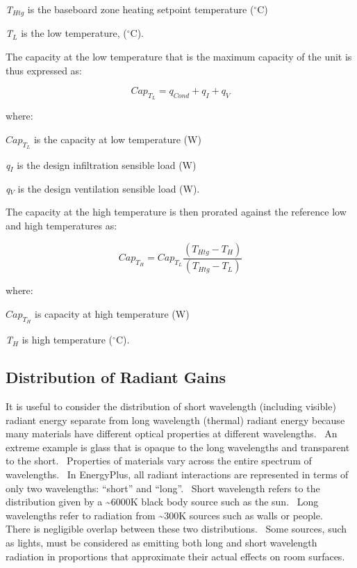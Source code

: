 \emph{T\(_{Htg}\)} is the baseboard zone heating setpoint temperature (\(^{\circ}\)C)

\emph{T\(_{L}\)} is the low temperature, (\(^{\circ}\)C).

The capacity at the low temperature that is the maximum capacity of the unit is thus expressed as:

\begin{equation}
Ca{p_{{T_L}}} = {q_{Cond}} + {q_I} + {q_V}
\end{equation}

where:

\(Ca{p_{{T_L}}}\) is the capacity at low temperature (W)

\emph{q\(_{I}\)} is the design infiltration sensible load (W)

\emph{q\(_{V}\)} is the design ventilation sensible load (W).

The capacity at the high temperature is then prorated against the reference low and high temperatures as:

\begin{equation}
Ca{p_{{T_H}}} = Ca{p_{{T_L}}}\frac{{\left( {{T_{Htg}} - {T_H}} \right)}}{{\left( {{T_{Htg}} - {T_L}} \right)}}
\end{equation}

where:

\(Ca{p_{{T_H}}}\) is capacity at high temperature (W)

\emph{T\(_{H}\)} is high temperature (\(^{\circ}\)C).

\subsection{Distribution of Radiant Gains}\label{distribution-of-radiant-gains}

It is useful to consider the distribution of short wavelength (including visible) radiant energy separate from long wavelength (thermal) radiant energy because many materials have different optical properties at different wavelengths.~ An extreme example is glass that is opaque to the long wavelengths and transparent to the short.~ Properties of materials vary across the entire spectrum of wavelengths.~ In EnergyPlus, all radiant interactions are represented in terms of only two wavelengths: ``short'' and ``long''.~ Short wavelength refers to the distribution given by a \textasciitilde{}6000K black body source such as the sun.~ Long wavelengths refer to radiation from \textasciitilde{}300K sources such as walls or people.~ There is negligible overlap between these two distributions.~ Some sources, such as lights, must be considered as emitting both long and short wavelength radiation in proportions that approximate their actual effects on room surfaces.

